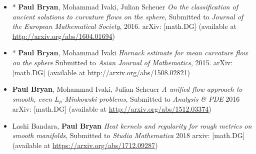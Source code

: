 \documentclass[12pt]{article}
\begin{document}
\begin{itemize}
\item * \textbf{Paul Bryan}, Mohammad Ivaki, Julian Scheuer \emph{On the classification of ancient solutions to curvature flows on the sphere}, Submitted to \emph{Journal of the European Mathematical Society}, 2016. arXiv: [math.DG] (available at \url{http://arxiv.org/abs/1604.01694})
\item * \textbf{Paul Bryan}, Mohammad Ivaki \emph{Harnack estimate for mean curvature flow on the sphere} Submitted to \emph{Asian Journal of Mathematics}, 2015. arXiv: [math.DG] (available at \url{http://arxiv.org/abs/1508.02821})
\item \textbf{Paul Bryan}, Mohammad Ivaki, Julian Scheuer \emph{A unified flow approach to smooth, even $L_p$-Minkowski problems}, Submitted to \emph{Analysis \& PDE} 2016 arXiv: [math.DG] (available at \url{http://arxiv.org/abs/1512.03374})
\item Lashi Bandara, \textbf{Paul Bryan} \emph{Heat kernels and regularity for rough metrics on smooth manifolds}, Submitted to \emph{Studia Mathematica} 2018 arxiv: [math.DG] (available at \url{https://arxiv.org/abs/1712.09287})
\end{itemize}
\end{document}

